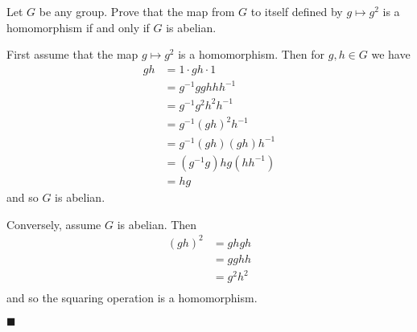 \documentclass[12pt]{article}
\renewcommand{\qed}{\hfill$\blacksquare$}
\renewenvironment{proof}{\begin{addmargin}[1em]{0em}\begin{newproof}}{\end{newproof}\end{addmargin}\qed}
\newenvironment{problem}[2][Exercise]{\begin{trivlist}
\item[\hskip \labelsep {\bfseries #1}\hskip \labelsep {\bfseries #2.}]}{\end{trivlist}}
\begin{document}
\begin{problem}{1.6.18}
Let $G$ be any group. Prove that the map from $G$ to itself defined by $g\mapsto g^2$ is a homomorphism if and only if $G$ is abelian.
\end{problem}
\begin{proof}
First assume that the map $g\mapsto g^2$ is a homomorphism. Then for $g,h\in G$ we have
\begin{equation*}
    \begin{split}
        gh & = 1\cdot gh \cdot 1 \\
        & = g^{-1}gghhh^{-1} \\
        & = g^{-1}g^2h^2h^{-1} \\
        & = g^{-1}\left(gh\right)^2h^{-1} \\
        & = g^{-1}\left(gh\right)\left(gh\right)h^{-1} \\
        & = \left(g^{-1}g\right)hg\left(hh^{-1}\right) \\
        & = hg
    \end{split}
\end{equation*}
and so $G$ is abelian.

Conversely, assume $G$ is abelian. Then
\begin{equation*}
    \begin{split}
        \left(gh\right)^2 & = ghgh \\
        & = gghh \\
        & = g^2h^2 \\
    \end{split}
\end{equation*}
and so the squaring operation is a homomorphism.
\end{proof}
\end{document}
